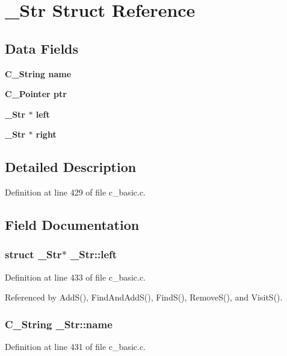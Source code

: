\section{\_\-Str Struct Reference}
\label{struct__Str}
\subsection*{Data Fields}
\begin{CompactItemize}
\item 
\bf{C\_\-String} \bf{name}
\item 
\bf{C\_\-Pointer} \bf{ptr}
\item 
\bf{\_\-Str} $\ast$ \bf{left}
\item 
\bf{\_\-Str} $\ast$ \bf{right}
\end{CompactItemize}


\subsection{Detailed Description}




Definition at line 429 of file c\_\-basic.c.

\subsection{Field Documentation}
\subsubsection{\setlength{\rightskip}{0pt plus 5cm}struct \bf{\_\-Str}$\ast$ \bf{\_\-Str::left}}\label{struct__Str_b43ceb481a2edc924df69f687a9a6de0}




Definition at line 433 of file c\_\-basic.c.

Referenced by Add\-S(), Find\-And\-Add\-S(), Find\-S(), Remove\-S(), and Visit\-S().
\subsubsection{\setlength{\rightskip}{0pt plus 5cm}\bf{C\_\-String} \bf{\_\-Str::name}}\label{struct__Str_3326fd4e3232cf5d56765f631d89caa7}




Definition at line 431 of file c\_\-basic.c.


